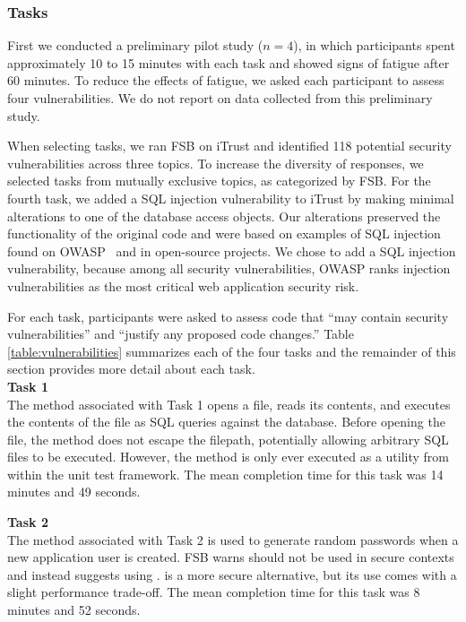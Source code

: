 \documentclass{sig-alternate}
\begin{document}

  
\subsubsection{Tasks}
First we conducted a preliminary pilot study ($n = 4$), in which  participants spent approximately 10 to 15 minutes with each task and showed signs of fatigue after 60 minutes.
To reduce the effects of fatigue, we asked each participant to assess four vulnerabilities. 
We do not report on data collected from this preliminary study.

When selecting tasks, we ran FSB on iTrust and identified 118 potential security vulnerabilities across three topics.
To increase the diversity of responses, we selected tasks from mutually exclusive topics, as categorized by FSB.
For the fourth task, we added a SQL injection vulnerability to iTrust by making minimal alterations to one of the database access objects.
Our alterations preserved the functionality of the original code and were based on examples of SQL injection found on OWASP~\cite{OWASP} and in open-source projects.
We chose to add a SQL injection vulnerability, because among all security vulnerabilities, OWASP ranks injection vulnerabilities as the most critical web application security risk.

For each task, participants were asked to assess code that ``may contain security vulnerabilities'' and ``justify any proposed code changes.''
Table \ref{table:vulnerabilities} summarizes each of the four tasks and the remainder of this section provides more detail about each task.\\

\noindent\textbf{Task 1} \\
The method associated with Task 1 opens a file, reads its contents, and executes the contents of the file as SQL queries against the database. 
Before opening the file, the method does not escape the filepath, potentially allowing arbitrary SQL files to be executed.
However, the method is only ever executed as a utility from within the unit test framework. The mean completion time for this task was 14 minutes and 49 seconds.

\noindent\textbf{Task 2} \\
The method associated with Task 2 is used to generate random passwords when a new application user is created. FSB warns  should not be used in secure contexts and instead suggests using .  is a more secure alternative, but its use comes with a slight performance trade-off. 
The mean completion time for this task was 8 minutes and 52 seconds.
\end{document}
